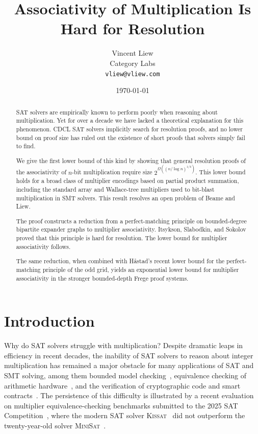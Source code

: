 \documentclass[11pt]{article}
\title{Associativity of Multiplication Is Hard for Resolution}
\author{Vincent Liew\\Category Labs\\\texttt{vliew@vliew.com}}
\date{\today}
\theoremstyle{definition}
\theoremstyle{remark}
\begin{document}
\maketitle

\begin{abstract}
SAT solvers are empirically known to perform poorly when reasoning about multiplication. Yet for over a decade we have lacked a theoretical explanation for this phenomenon. CDCL SAT solvers implicitly search for resolution proofs, and no lower bound on proof size has ruled out the existence of short proofs that solvers simply fail to find.

We give the first lower bound of this kind by showing that general resolution proofs of the associativity of $n$-bit multiplication require size $2^{\Omega((n/\log n)^{1/4})}$. This lower bound holds for a broad class of multiplier
encodings based on partial product summation, including the standard array and Wallace-tree multipliers used to bit-blast multiplication
in SMT solvers. This result resolves an open problem of Beame and Liew.

The proof constructs a reduction from a perfect-matching principle on bounded-degree bipartite expander graphs to multiplier associativity. Itsykson, Slabodkin, and Sokolov proved that this principle is hard for resolution. The lower bound
for multiplier associativity follows.

The same reduction, when combined with H\r{a}stad's recent lower bound for the perfect-matching principle of the odd grid, yields an exponential lower bound for multiplier associativity in the stronger bounded-depth Frege proof systems.
\end{abstract}
\thispagestyle{empty}
\newpage
{}

\section{Introduction}
\label{sec:intro}

Why do SAT solvers struggle with multiplication?
Despite dramatic leaps in efficiency in recent decades, the inability of SAT solvers to reason about integer multiplication has remained a major obstacle for many applications of SAT and SMT solving, among them bounded model checking~\cite{bbkmt26}, equivalence checking of arithmetic hardware~\cite{kbk-fmcad,bkks25}, and the verification of cryptographic code and smart contracts~\cite{cryptoline,intblast,polysat}. The persistence of this difficulty is illustrated by a recent evaluation on multiplier equivalence-checking benchmarks submitted to the 2025 SAT Competition~\cite{bkks25}, where the modern SAT solver \textsc{Kissat}~\cite{kissat} did not outperform the twenty-year-old solver \textsc{MiniSat}~\cite{minisat}.
\end{document}
